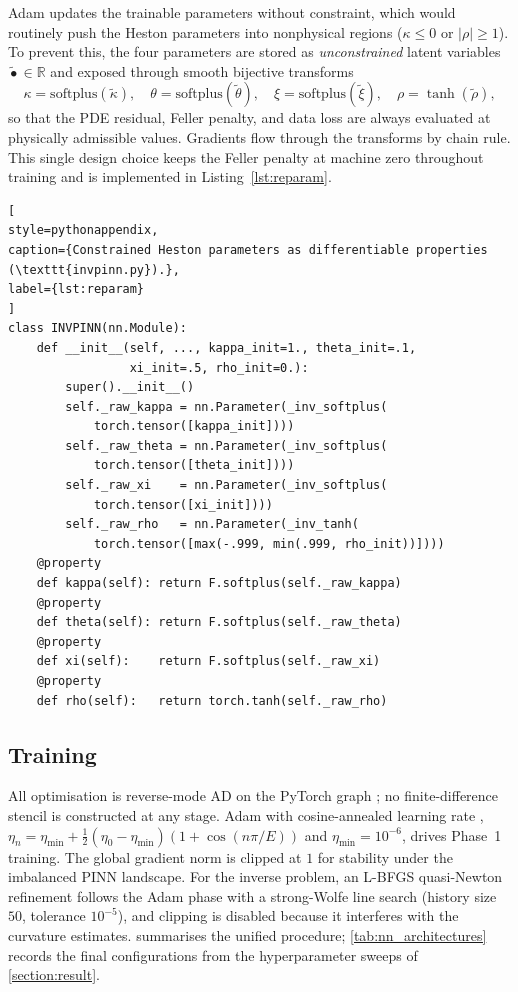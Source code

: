 Adam updates the trainable parameters without constraint, which would routinely push the Heston parameters into nonphysical regions ($\kappa\le0$ or $|\rho|\ge 1$). To prevent this, the four parameters are stored as \emph{unconstrained} latent variables $\tilde{\bullet}\in\mathbb{R}$ and exposed through smooth bijective transforms
\begin{equation}\label{eq:reparam}
    \kappa=\mathrm{softplus}(\tilde\kappa),\quad \theta=\mathrm{softplus}(\tilde\theta),\quad \xi=\mathrm{softplus}(\tilde\xi),\quad \rho=\tanh(\tilde\rho),
\end{equation}
so that the PDE residual, Feller penalty, and data loss are always evaluated at physically admissible values. Gradients flow through the transforms by chain rule. This single design choice keeps the Feller penalty at machine zero throughout training and is implemented in Listing~\ref{lst:reparam}.

\begin{lstlisting}[
style=pythonappendix,
caption={Constrained Heston parameters as differentiable properties (\texttt{invpinn.py}).},
label={lst:reparam}
]
class INVPINN(nn.Module):
    def __init__(self, ..., kappa_init=1., theta_init=.1,
                 xi_init=.5, rho_init=0.):
        super().__init__()
        self._raw_kappa = nn.Parameter(_inv_softplus(
            torch.tensor([kappa_init])))
        self._raw_theta = nn.Parameter(_inv_softplus(
            torch.tensor([theta_init])))
        self._raw_xi    = nn.Parameter(_inv_softplus(
            torch.tensor([xi_init])))
        self._raw_rho   = nn.Parameter(_inv_tanh(
            torch.tensor([max(-.999, min(.999, rho_init))])))
    @property
    def kappa(self): return F.softplus(self._raw_kappa)
    @property
    def theta(self): return F.softplus(self._raw_theta)
    @property
    def xi(self):    return F.softplus(self._raw_xi)
    @property
    def rho(self):   return torch.tanh(self._raw_rho)
\end{lstlisting}

\subsection{Training}\label{subsec:training}

All optimisation is reverse-mode AD on the PyTorch graph \parencite{baydin2018automatic,paszke2019pytorch}; no finite-difference stencil is constructed at any stage. Adam \parencite{kingma2015adam} with cosine-annealed learning rate \parencite{loshchilov2017sgdr}, $\eta_n=\eta_{\min}+\tfrac{1}{2}(\eta_0-\eta_{\min})(1+\cos(n\pi/E))$ and $\eta_{\min}=10^{-6}$, drives Phase~1 training. The global gradient norm is clipped at $1$ \parencite{pascanu2013difficulty} for stability under the imbalanced PINN landscape. For the inverse problem, an L-BFGS quasi-Newton refinement \parencite{liu1989limited} follows the Adam phase with a strong-Wolfe line search (history size $50$, tolerance $10^{-5}$), and clipping is disabled because it interferes with the curvature estimates.  summarises the unified procedure; \cref{tab:nn_architectures} records the final configurations from the hyperparameter sweeps of \cref{section:result}.

